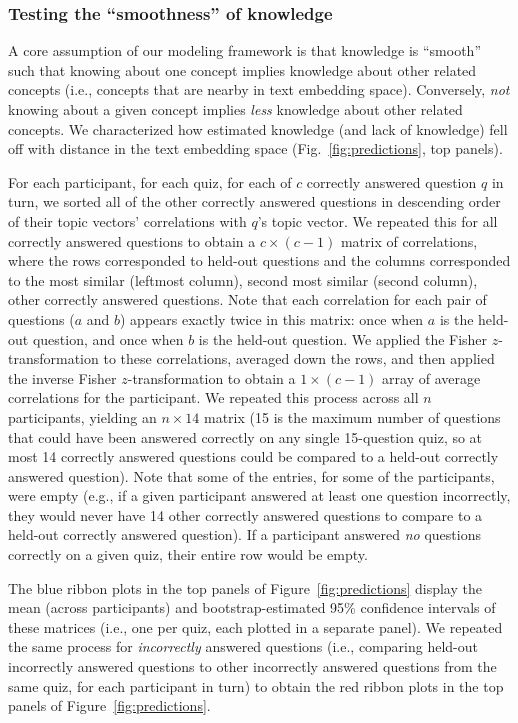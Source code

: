 \documentclass[10pt]{article}
\begin{document}
\subsubsection*{Testing the ``smoothness'' of knowledge}

A core assumption of our modeling framework is that knowledge is ``smooth''
such that knowing about one concept implies knowledge about other related
concepts (i.e., concepts that are nearby in text embedding space). Conversely,
\textit{not} knowing about a given concept implies \textit{less} knowledge
about other related concepts. We characterized how estimated knowledge (and
lack of knowledge) fell off with distance in the text embedding space
(Fig.~\ref{fig:predictions}, top panels).

For each participant, for each quiz, for each of $c$ correctly answered
question $q$ in turn, we sorted all of the other correctly answered questions
in descending order of their topic vectors' correlations with $q$'s topic
vector. We repeated this for all correctly answered questions to obtain a $c
\times (c - 1)$ matrix of correlations, where the rows corresponded to held-out
questions and the columns corresponded to the most similar (leftmost column),
second most similar (second column), other correctly answered questions. Note
that each correlation for each pair of questions ($a$ and $b$) appears exactly
twice in this matrix: once when $a$ is the held-out question, and once when $b$
is the held-out question. We applied the Fisher $z$-transformation to these
correlations, averaged down the rows, and then applied the inverse Fisher
$z$-transformation to obtain a $1 \times (c - 1)$ array of average correlations
for the participant. We repeated this process across all $n$ participants,
yielding an $n \times 14$ matrix (15 is the maximum number of questions that
could have been answered correctly on any single 15-question quiz, so at most
14 correctly answered questions could be compared to a held-out correctly
answered question). Note that some of the entries, for some of the
participants, were empty (e.g., if a given participant answered at least one
question incorrectly, they would never have 14 other correctly answered
questions to compare to a held-out correctly answered question). If a
participant answered \textit{no} questions correctly on a given quiz, their
entire row would be empty.

The blue ribbon plots in the top panels of Figure~\ref{fig:predictions} display
the mean (across participants) and bootstrap-estimated 95\% confidence
intervals of these matrices (i.e., one per quiz, each plotted in a separate
panel). We repeated the same process for \textit{incorrectly} answered
questions (i.e., comparing held-out incorrectly answered questions to other
incorrectly answered questions from the same quiz, for each participant in
turn) to obtain the red ribbon plots in the top panels of
Figure~\ref{fig:predictions}.
\end{document}
